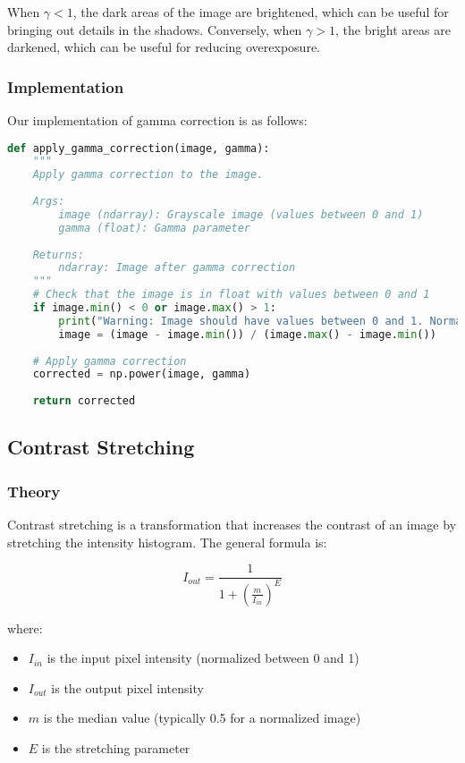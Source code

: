 \documentclass[12pt,a4paper]{article}
\begin{document}
When $\gamma < 1$, the dark areas of the image are brightened, which can be useful for bringing out details in the shadows. Conversely, when $\gamma > 1$, the bright areas are darkened, which can be useful for reducing overexposure.

\subsubsection{Implementation}

Our implementation of gamma correction is as follows:

\begin{lstlisting}[language=Python, caption=Gamma correction implementation]
def apply_gamma_correction(image, gamma):
    """
    Apply gamma correction to the image.
    
    Args:
        image (ndarray): Grayscale image (values between 0 and 1)
        gamma (float): Gamma parameter
        
    Returns:
        ndarray: Image after gamma correction
    """
    # Check that the image is in float with values between 0 and 1
    if image.min() < 0 or image.max() > 1:
        print("Warning: Image should have values between 0 and 1. Normalization applied.")
        image = (image - image.min()) / (image.max() - image.min())
    
    # Apply gamma correction
    corrected = np.power(image, gamma)
    
    return corrected
\end{lstlisting}

\subsection{Contrast Stretching}

\subsubsection{Theory}

Contrast stretching is a transformation that increases the contrast of an image by stretching the intensity histogram. The general formula is:

\begin{equation}
    I_{out} = \frac{1}{1 + \left(\frac{m}{I_{in}}\right)^E}
\end{equation}

where:
\begin{itemize}
    \item $I_{in}$ is the input pixel intensity (normalized between 0 and 1)
    \item $I_{out}$ is the output pixel intensity
    \item $m$ is the median value (typically 0.5 for a normalized image)
    \item $E$ is the stretching parameter
\end{itemize}
\end{document}
